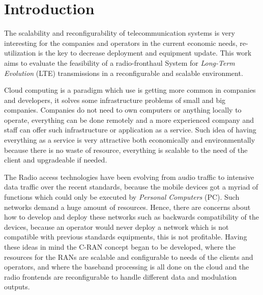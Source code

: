 \chapter{Introduction}
\label{chap:intro}


The scalability and reconfigurability of telecommunication systems is very
interesting for the companies and operators in the current economic needs,
re-utilization is the key to decrease deployment and equipment update. This work
aims to evaluate the feasibility of a radio-fronthaul System for
\textit{Long-Term Evolution} (LTE) transmissions in a reconfigurable and scalable
environment.

Cloud computing is a paradigm which use is getting more common in companies and
developers, it solves some infrastructure problems of small and big companies.
Companies do not need to own computers or anything locally to operate,
everything can be done remotely and a more experienced company and staff can
offer such infrastructure or application as a service. Such idea of having
everything as a service is very attractive both economically  and
environmentally because there is no waste of resource, everything is scalable to
the need of the client and upgradeable if needed.

The Radio access technologies have been evolving from audio traffic to intensive
data traffic over the recent standards, because the mobile devices got a myriad
of functions which could only be executed by \textit{Personal Computers} (PC).
Such networks demand a huge amount of resources. Hence, there are concerns about
how to develop and deploy these networks such as backwards compatibility of the
devices, because an operator would never deploy a network which is not
compatible with previous standards equipments, this is not profitable. Having
these ideas in mind the C-RAN concept began to be developed,  where the
resources for the RANs are scalable and configurable to needs of the clients and
operators, and where the baseband processing is all done on the cloud and the
radio frontends are reconfigurable to handle different data and modulation
outputs.

